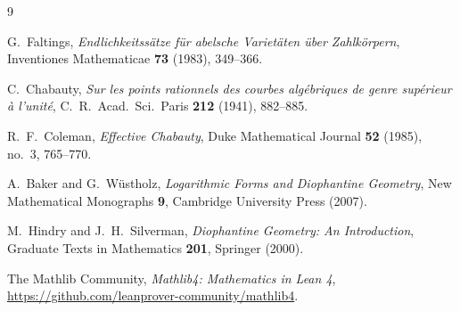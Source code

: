 \documentclass[12pt, a4paper]{article}
\theoremstyle{definition}
\begin{document}
\begin{thebibliography}{9}

  G.~Faltings,
  \textit{Endlichkeitssätze für abelsche Varietäten über Zahlkörpern},
  Inventiones Mathematicae \textbf{73} (1983), 349--366.

  C.~Chabauty,
  \textit{Sur les points rationnels des courbes algébriques de genre supérieur à l'unité},
  C.~R.~Acad.~Sci.~Paris \textbf{212} (1941), 882--885.

  R.~F.~Coleman,
  \textit{Effective Chabauty},
  Duke Mathematical Journal \textbf{52} (1985), no.~3, 765--770.

  A.~Baker and G.~W\"ustholz,
  \textit{Logarithmic Forms and Diophantine Geometry},
  New Mathematical Monographs \textbf{9},
  Cambridge University Press (2007).

  M.~Hindry and J.~H.~Silverman,
  \textit{Diophantine Geometry: An Introduction},
  Graduate Texts in Mathematics \textbf{201},
  Springer (2000).

  The Mathlib Community,
  \textit{Mathlib4: Mathematics in Lean 4},
  \url{https://github.com/leanprover-community/mathlib4}.

\end{thebibliography}
\end{document}
